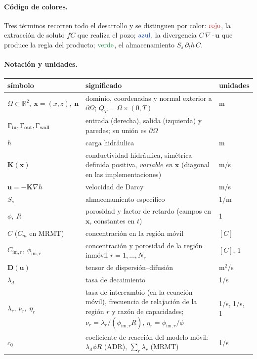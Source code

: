\documentclass[11pt]{article}
\numberwithin{equation}{section}
\theoremstyle{plain}
\theoremstyle{definition}
\theoremstyle{remark}
\newcommand{\bu}{\mathbf{u}}
\newcommand{\bK}{\mathbf{K}}
\newcommand{\bD}{\mathbf{D}}
\newcommand{\bn}{\mathbf{n}}
\newcommand{\bx}{\mathbf{x}}
\newcommand{\im}{\mathrm{im}}
\newcommand{\sumi}[1]{{\color{cSum}#1}}
\newcommand{\divi}[1]{{\color{cDiv}#1}}
\newcommand{\alm}[1]{{\color{cAlm}#1}}
\begin{document}
\paragraph{Código de colores.} Tres términos recorren todo el desarrollo y se distinguen por color:
$\sumi{\text{rojo}}$, la extracción de soluto $fC$ que realiza el pozo;
$\divi{\text{azul}}$, la divergencia $C\,\nabla\!\cdot\bu$ que produce la regla del producto;
$\alm{\text{verde}}$, el almacenamiento $S_s\,\partial_th\,C$.

\paragraph{Notación y unidades.}
\begin{center}\small
\begin{tabular}{p{3.3cm}p{9.2cm}p{2.3cm}}
\toprule
símbolo & significado & unidades \\
\midrule
$\Omega\subset\mathbb{R}^2,\ \bx=(x,z),\ \bn$ & dominio, coordenadas y normal exterior a $\partial\Omega$; $Q_T=\Omega\times(0,T)$ & m \\
$\Gamma_{\rm in},\Gamma_{\rm out},\Gamma_{\rm wall}$ & entrada (derecha), salida (izquierda) y paredes; su unión es $\partial\Omega$ & \\
$h$ & carga hidráulica & m \\
$\bK(\bx)$ & conductividad hidráulica, simétrica definida positiva, \emph{variable en $\bx$} (diagonal en las implementaciones) & m/s \\
$\bu=-\bK\nabla h$ & velocidad de Darcy & m/s \\
$S_s$ & almacenamiento específico & 1/m \\
$\phi,\ R$ & porosidad y factor de retardo (campos en $\bx$, constantes en $t$) & 1 \\
$C$ ($C_m$ en MRMT) & concentración en la región móvil & $[C]$ \\
$C_{\im,r},\ \phi_{\im,r}$ & concentración y porosidad de la región inmóvil $r=1,\dots,N_r$ & $[C]$, 1 \\
$\bD(\bu)$ & tensor de dispersión--difusión & m$^2$/s \\
$\lambda_d$ & tasa de decaimiento & 1/s \\
$\lambda_r,\ \nu_r,\ \eta_r$ & tasa de intercambio (en la ecuación móvil), frecuencia de relajación de la región $r$ y razón de capacidades; $\nu_r=\lambda_r/(\phi_{\im,r}R)$, $\eta_r=\phi_{\im,r}/\phi$ & 1/s, 1/s, 1 \\
$c_0$ & coeficiente de reacción del modelo móvil: $\lambda_d\phi R$ (ADR), $\sum_r\lambda_r$ (MRMT) & 1/s \\

\end{tabular}
\end{center}
\end{document}
